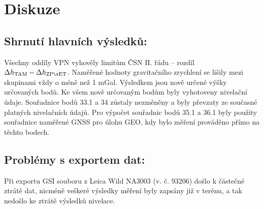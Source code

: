 \section{Diskuze}


\subsection{Shrnutí hlavních výsledků:}
Všechny oddíly VPN vyhověly limitům ČSN II. řádu – rozdíl \(\Delta h_{\rm TAM}-\Delta h_{\rm ZPĚT}\).
Naměřené hodnoty gravitačního zrychlení se lišily mezi skupinami vždy o méně než 1 mGal. Výsledkem jsou nově určené výšky určovaných bodů. Ke všem nově určovaným bodům byly vyhotoveny nivelační údaje. Souřadnice bodů 33.1 a 34 zůstaly nezměněny a byly převzaty ze současné platných nivelačních údajů. Pro výpočet souřadnic bodů 35.1 a 36.1 byly použity souřadnice naměřené GNSS pro úlohu GEO, kdy bylo měření prováděno přímo na těchto bodech.

\subsection{Problémy s exportem dat:}
    Při exportu GSI souboru z Leica Wild NA3003 (v. č. 93206) došlo k částečné ztrátě dat, nicméně veškeré výsledky měření byly zapsány již v terénu, a tak nedošlo ke ztrátě výsledků nivelace.
